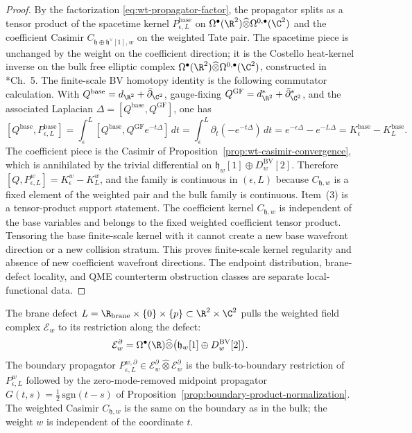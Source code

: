 \begin{proof}
  By the factorization \eqref{eq:wt-propagator-factor}, the
  propagator splits as a tensor product of the spacetime kernel
  $P_{\epsilon,L}^{\mathrm{base}}$ on
  $\Omega^\bullet(\R^2)\widehat\otimes\Omega^{0,\bullet}(\C^2)$ and
  the coefficient Casimir $C_{\mathfrak h\oplus\mathfrak h^\vee[1],w}$
  on the weighted Tate pair. The spacetime piece is unchanged by the
  weight on the coefficient direction; it is the Costello heat-kernel
  inverse on the bulk free elliptic complex
  $\Omega^\bullet(\R^2)\widehat\otimes\Omega^{0,\bullet}(\C^2)$,
  constructed in \cite{costello-renormalization}*{Ch.~5}. The finite-scale
  BV homotopy identity is the following commutator calculation.  With
  $Q^{\mathrm{base}}=d_{\R^2}+\bar\partial_{\C^2}$, gauge-fixing
  $Q^{\mathrm{GF}}=d_{\R^2}^*+\bar\partial_{\C^2}^*$, and the
  associated Laplacian $\Delta=[Q^{\mathrm{base}},Q^{\mathrm{GF}}]$,
  one has
  $$[Q^{\mathrm{base}},P_{\epsilon,L}^{\mathrm{base}}]
    =\int_\epsilon^L[Q^{\mathrm{base}},Q^{\mathrm{GF}}e^{-t\Delta}]\,dt
    =\int_\epsilon^L\partial_t(-e^{-t\Delta})\,dt
    =e^{-\epsilon\Delta}-e^{-L\Delta}=K_\epsilon^{\mathrm{base}}
    -K_L^{\mathrm{base}}.$$
  The coefficient piece is the Casimir of
  Proposition~\ref{prop:wt-casimir-convergence}, which is annihilated
  by the trivial differential on
  $\mathfrak h_w[1]\oplus D^{\mathrm{BV}}_w[2]$.
  Therefore
  $[Q,P_{\epsilon,L}^{w}]=K_\epsilon^{w}-K_L^{w}$, and the family is
  continuous in $(\epsilon,L)$ because $C_{\mathfrak h,w}$ is a fixed
  element of the weighted pair and the bulk family is continuous.
  Item~(3) is a tensor-product support statement.  The coefficient
  kernel \(C_{\mathfrak h,w}\) is independent of the base variables and
  belongs to the fixed weighted coefficient tensor product.  Tensoring
  the base finite-scale kernel with it cannot create a new base
  wavefront direction or a new collision stratum.  This proves
  finite-scale kernel regularity and absence of new coefficient
  wavefront directions.  The endpoint distribution, brane-defect
  locality, and QME counterterm obstruction classes are separate
  local-functional data.
\end{proof}

\begin{rmk}\label{rmk:wt-brane-defect}
  The brane defect
  \(L=\R_{\mathrm{brane}}\times\{0\}\times\{p\}
  \subset\R^2\times\C^2\) pulls the
  weighted field complex $\mathcal E_w$ to its restriction along the
  defect:
  $$\mathcal E_w^{\partial}=\Omega^\bullet(\R)\widehat\otimes\bigl(
    \mathfrak h_w[1]\oplus D^{\mathrm{BV}}_w[2]\bigr).$$
  The boundary propagator
  $P_{\epsilon,L}^{w,\partial}\in\mathcal E_w^\partial\widehat\otimes
  \mathcal E_w^\partial$ is the bulk-to-boundary restriction of
  $P_{\epsilon,L}^{w}$ followed by the zero-mode-removed midpoint
  propagator $G(t,s)=\frac12\,\mathrm{sgn}(t-s)$ of
  Proposition~\ref{prop:boundary-product-normalization}.
  The weighted Casimir $C_{\mathfrak h,w}$ is the same on the boundary
  as in the bulk; the weight $w$ is independent of the coordinate $t$.
\end{rmk}

